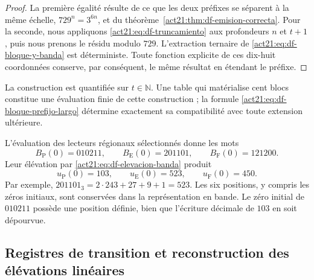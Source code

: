 \begin{proof}
La première égalité résulte de ce que les deux préfixes se séparent à la même
échelle, \(729^n=3^{6n}\), et du
théorème~\ref{act21:thm:df-emision-correcta}. Pour la seconde, nous appliquons
\eqref{act21:eq:df-truncamiento} aux profondeurs \(n\) et \(t+1\), puis
nous prenons le résidu modulo \(729\). L'extraction ternaire de
\eqref{act21:eq:df-bloque-y-banda} est déterministe. Toute fonction explicite
de ces dix-huit coordonnées conserve, par conséquent, le même résultat en
étendant le préfixe.
\end{proof}

La construction est quantifiée sur \(t\in\mathbb N\). Une table qui
matérialise cent blocs constitue une évaluation finie de cette
construction ; la formule \eqref{act21:eq:df-bloque-prefijo-largo} détermine
exactement sa compatibilité avec toute extension ultérieure.

\begin{example}
L'évaluation des lecteurs régionaux sélectionnés donne les mots
\[
 B_{\mathrm P}(0)=010211,\qquad
 B_{\mathrm E}(0)=201101,\qquad
 B_{\mathrm F}(0)=121200.
\]
Leur élévation par \eqref{act21:eq:df-elevacion-banda} produit
\[
 u_{\mathrm P}(0)=103,\qquad
 u_{\mathrm E}(0)=523,\qquad
 u_{\mathrm F}(0)=450.
\]
Par exemple,
\(201101_3=2\cdot243+27+9+1=523\).
Les six positions, y compris les zéros initiaux, sont conservées dans la
représentation en bande. Le zéro initial de \(010211\) possède une position
définie, bien que l'écriture décimale de \(103\) en soit dépourvue.
\end{example}

\subsection{Registres de transition et reconstruction des élévations linéaires}
\label{act21:subsec:df-registros-transicion}


